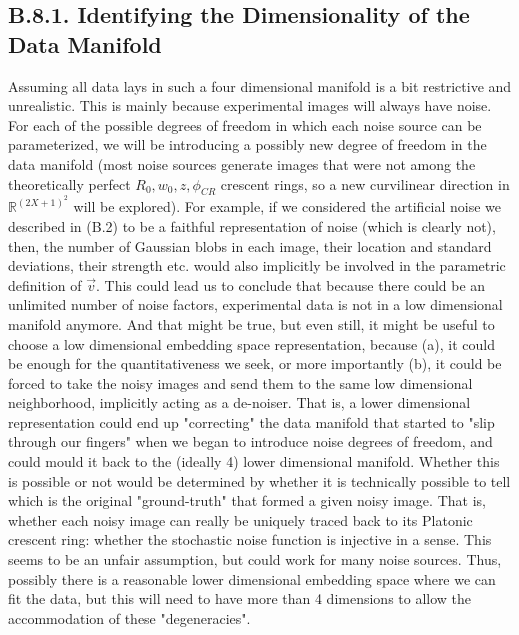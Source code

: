 \documentclass[11pt, a4paper, twoside]{article} %
\newcommand{\R}{\mathbb{R}} %
\begin{document}
\subsection*{B.8.1. Identifying the Dimensionality of the Data Manifold}\vspace{-0.1cm}

Assuming all data lays in such a four dimensional manifold is a bit restrictive and unrealistic. This is mainly because experimental images will always have noise. For each of the possible degrees of freedom in which each noise source can be parameterized, we will be introducing a possibly new degree of freedom in the data manifold (most noise sources generate images that were not among the theoretically perfect $R_0,w_0,z,\phi_{CR}$ crescent rings, so a new curvilinear direction in $\R^{(2X+1)^2}$ will be explored). For example, if we considered the artificial noise we described in (B.2) to be a faithful representation of noise (which is clearly not), then, the number of Gaussian blobs in each image, their location and standard deviations, their strength etc. would also implicitly be involved in the parametric definition of $\vec{v}$. This could lead us to conclude that because there could be an unlimited number of noise factors, experimental data is not in a low dimensional manifold anymore. And that might be true, but even still, it might be useful to choose a low dimensional embedding space representation, because (a), it could be enough for the quantitativeness we seek, or more importantly (b), it could be forced to take the noisy images and send them to the same low dimensional neighborhood, implicitly acting as a de-noiser. That is, a lower dimensional representation could end up "correcting" the data manifold that started to "slip through our fingers" when we began to introduce noise degrees of freedom, and could mould it back to the (ideally 4) lower dimensional manifold. Whether this is possible or not would be determined by whether it is technically possible to tell which is the original "ground-truth" that formed a given noisy image. That is, whether each noisy image can really be uniquely traced back to its Platonic crescent ring: whether the stochastic noise function is injective in a sense. This seems to be an unfair assumption, but could work for many noise sources. Thus, possibly there is a reasonable lower dimensional embedding space where we can fit the data, but this will need to have more than 4 dimensions to allow the accommodation of these "degeneracies".
\end{document}
